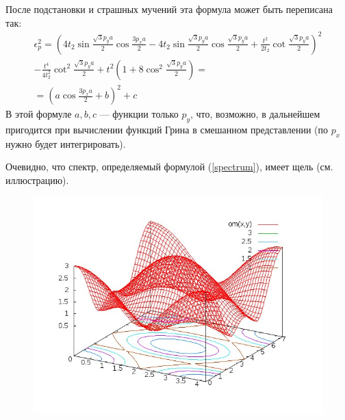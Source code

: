 \documentclass{article}
\begin{document}
	После подстановки и страшных мучений эта формула может быть переписана так:
	\begin{multline}
		\epsilon_p^2 = \left(4t_2\sin{\frac{\sqrt{3}p_ya}{2}} \cos{\frac{3p_xa}{2}} - 
				4t_2\sin{\frac{\sqrt{3}p_ya}{2}} \cos{\frac{\sqrt{3}p_ya}{2}} +
				\frac{t^2}{2t_2} \cot{\frac{\sqrt{3}p_ya}{2}}\right)^2\\
				- \frac{t^4}{4t_2^2}\cot^2{\frac{\sqrt{3}p_ya}{2}}
				+ t^2\left(1 + 8\cos^2{\frac{\sqrt{3}p_ya}{2}}\right) = \\
				= \left(a\cos{\frac{3p_xa}{2}} + b\right)^2 + c
	\end{multline}
	В этой формуле $a,b,c$ --- функции только $p_y$, что, возможно, в дальнейшем пригодится
	при вычислении функций Грина в смешанном представлении (по $p_x$ нужно будет
	интегрировать).
	
	Очевидно, что спектр, определяемый формулой (\ref{spectrum}), 
	имеет щель (см. иллюстрацию).
	\begin{figure}[h]
		\includegraphics[width=\linewidth]{haldane_spectrum.jpg}
	\end{figure}
\end{document}
